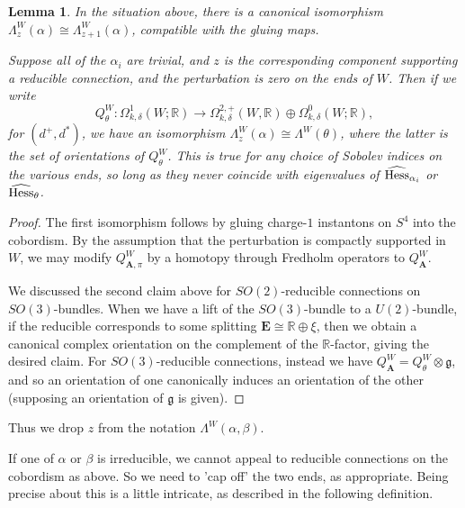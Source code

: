 \documentclass{memo-l}
\newtheorem{lemma}[theorem]{Lemma}
\theoremstyle{definition}
\theoremstyle{remark}
\numberwithin{section}{chapter}
\numberwithin{equation}{chapter}
\begin{document}
\begin{lemma}In the situation above, there is a canonical isomorphism $\Lambda_z^W(\alpha) \cong \Lambda_{z+1}^W(\alpha)$, compatible with the gluing maps.

Suppose all of the $\alpha_i$ are trivial, and $z$ is the corresponding component supporting a reducible connection, and the perturbation is zero on the ends of $W$. Then if we write $$Q^W_\theta: \Omega^1_{k,\delta}(W;\mathbb R) \to \Omega^{2,+}_{k,\delta}(W, \mathbb R) \oplus \Omega^0_{k,\delta}(W; \mathbb R),$$ for $(d^+, d^*)$, we have an isomorphism $\Lambda_z^W(\alpha) \cong \Lambda^W(\theta)$, where the latter is the set of orientations of $Q^W_\theta$. This is true for any choice of Sobolev indices on the various ends, so long as they never coincide with eigenvalues of $\widehat{\textup{Hess}}_{\alpha_i}$ or $\widehat{\textup{Hess}}_\theta$.
\end{lemma}
\begin{proof}The first isomorphism follows by gluing charge-$1$ instantons on $S^4$ into the cobordism. By the assumption that the perturbation is compactly supported in $W$, we may modify $Q^W_{\mathbf{A},\pi}$ by a homotopy through Fredholm operators to $Q^W_{\mathbf{A}}$.

We discussed the second claim above for $SO(2)$-reducible connections on $SO(3)$-bundles. When we have a lift of the $SO(3)$-bundle to a $U(2)$-bundle, if the reducible corresponds to some splitting $\mathbf{E} \cong \mathbb R \oplus \xi$, then we obtain a canonical complex orientation on the complement of the $\mathbb R$-factor, giving the desired claim. For $SO(3)$-reducible connections, instead we have $Q^W_{\mathbf{A}} = Q^W_\theta \otimes \mathfrak g$, and so an orientation of one canonically induces an orientation of the other (supposing an orientation of $\mathfrak g$ is given).
\end{proof}

Thus we drop $z$ from the notation $\Lambda^W(\alpha, \beta)$.

If one of $\alpha$ or $\beta$ is irreducible, we cannot appeal to reducible connections on the cobordism as above. So we need to 'cap off' the two ends, as appropriate. Being precise about this is a little intricate, as described in the following definition.
\end{document}
